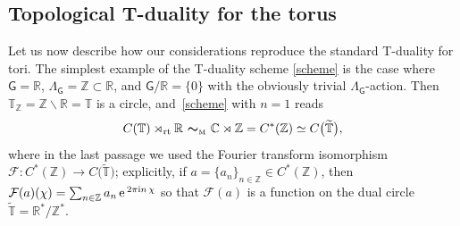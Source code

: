 \documentclass[10pt,a4paper]{amsart}
\numberwithin{equation}{section}
\newcommand{\mbf}[1]{{\boldsymbol {#1} }}
\def\ii{{{\rm i}}}
\newcommand{\sfG}{\mathsf{G}}
\newcommand{\rt}{{\rm rt}}
\newcommand{\complex}{{\mathbb C}} %
\newcommand{\zed}{{\mathbb Z}} %
\newcommand{\real}{{\mathbb R}} %
\newcommand{\torus}{{\mathbb T}} %
\def\e{{\,\rm e}\,}
\begin{document}
\subsection{Topological T-duality for the torus}\label{sec:toruscrossedprod}

Let us now describe how our considerations reproduce the standard
T-duality for tori.
The simplest example of the T-duality scheme \eqref{scheme} is the case where $\sfG
=\real$, $\Lambda_\sfG =\zed\subset\real$, and $\sfG/\real=\{0\}$ with the obviously trivial $\Lambda_\sfG$-action. Then
$\torus_\zed= \zed\backslash\real=\torus$ is a circle, and~\eqref{scheme} with $n=1$ reads
\[
C(\torus)\rtimes_\rt \real \ \mbf\sim_{\text{\tiny M}} \ \complex\rtimes \zed
 = C^*(\zed) \simeq C\big(\widetilde\torus\big) ,
\]
where in the last passage we used the Fourier transform isomorphism
${\mathcal F}\colon C^*(\zed)\to C\big(\widetilde\torus\big)$; explicitly,
if $a=\{a_{n}\}_{n\in \zed}\in C^*(\zed)$, then
${\mathcal F}(a)(\chi)=\sum_{n\in \zed} a_{n} \e^{2\pi\ii n\,\chi}$ so that
 ${\mathcal F}(a)$ is a function on the
dual circle $\widetilde\torus=\real^*/\zed^*$.
\end{document}
